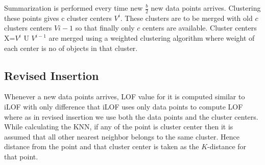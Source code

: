 Summarization is performed every time new $\frac{b}{2}$ new data points arrives. Clustering these points gives c cluster centers $V^i$. These clusters are to be merged with old $c$ clusters centers $V{i-1}$ so that finally only $c$ centers are available. Cluster centers X={$V^i$ U $V^{i-1}$} are merged using a weighted clustering algorithm where weight of each center is no of objects in that cluster. 


\subsection{Revised Insertion}
Whenever a new data points arrives, LOF value for it is computed similar to iLOF with only difference that iLOF uses only data points to compute LOF where as in revised insertion we use both the data points and the cluster centers. While calculating the KNN, if any of the point is cluster center then it is assumed that all other nearest neighbor belongs to the same cluster. Hence distance from the point and that cluster center is taken as the $K$-distance for that point.  

